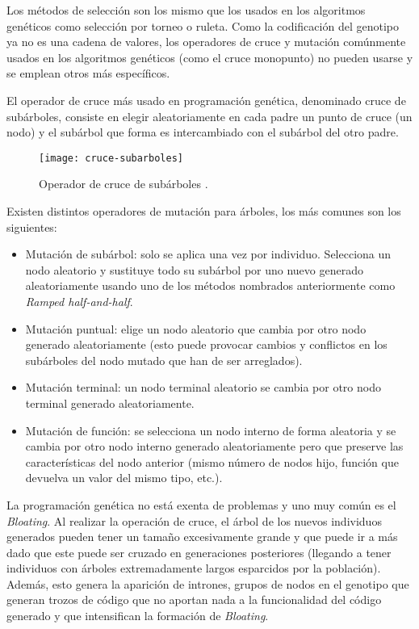 Los métodos de selección son los mismo que los usados en los algoritmos genéticos como selección por torneo o ruleta.
Como la codificación del genotipo ya no es una cadena de valores, los operadores de cruce y mutación comúnmente usados en los algoritmos genéticos (como el cruce monopunto) no pueden usarse y se emplean otros más específicos.

\blankline

El operador de cruce más usado en programación genética, denominado cruce de subárboles, consiste en elegir aleatoriamente en cada padre un punto de cruce (un nodo) y el subárbol que forma es intercambiado con el subárbol del otro padre.

\begin{figure}[H]
\centering
\texttt{[image: cruce-subarboles]}
\caption{Operador de cruce de subárboles \cite{tsang2000eddie}.}
\end{figure}

Existen distintos operadores de mutación para árboles, los más comunes son los siguientes:
\begin{itemize}
\item Mutación de subárbol: solo se aplica una vez por individuo. Selecciona un nodo aleatorio y sustituye todo su subárbol por uno nuevo generado aleatoriamente usando uno de los métodos nombrados anteriormente como \textit{Ramped half-and-half}.

\item Mutación puntual: elige un nodo aleatorio que cambia por otro nodo generado aleatoriamente (esto puede provocar cambios y conflictos en los subárboles del nodo mutado que han de ser arreglados).

\item Mutación terminal: un nodo terminal aleatorio se cambia por otro nodo terminal generado aleatoriamente.

\item Mutación de función: se selecciona un nodo interno de forma aleatoria y se cambia por otro nodo interno generado aleatoriamente pero que preserve las características del nodo anterior (mismo número de nodos hijo, función que devuelva un valor del mismo tipo, etc.).
\end{itemize}

La programación genética no está exenta de problemas y uno muy común es el \textit{Bloating}. Al realizar la operación de cruce, el árbol de los nuevos individuos generados pueden tener un tamaño excesivamente grande y que puede ir a más dado que este puede ser cruzado en generaciones posteriores (llegando a tener individuos con árboles extremadamente largos esparcidos por la población). Además, esto genera la aparición de intrones, grupos de nodos en el genotipo que generan trozos de código que no aportan nada a la funcionalidad del código generado y que intensifican la formación de \textit{Bloating}.


